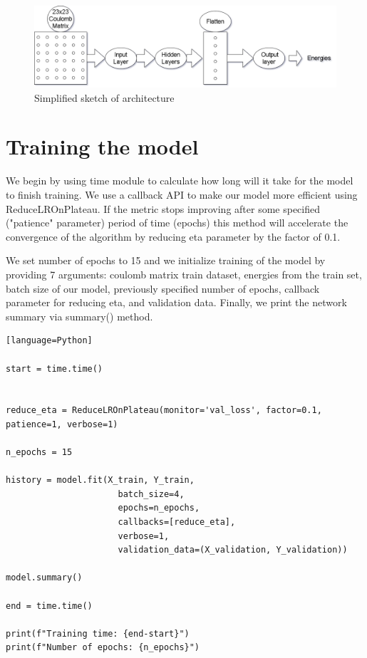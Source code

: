 \documentclass[a4paper,oneside,openright,11pt]{book}
\begin{document}
\begin{figure}[h!]
\centering
\includegraphics[scale=0.4]{DocumentFigures/MyFigures/FlattenOperatioNNscheme.png}
\caption{Simplified sketch of architecture}
\end{figure}


\section{Training the model}


We begin by using time module to calculate how long will it take for the model to finish training. We use a callback API to make our model more efficient using ReduceLROnPlateau. If the metric stops improving after some specified ("patience" parameter) period of time (epochs) this method will accelerate the convergence of the algorithm by reducing eta parameter by the factor of 0.1.

We set number of epochs to 15 and we initialize training of the model by providing 7 arguments: coulomb matrix train dataset, energies from the train set, batch size of our model, previously specified number of epochs, callback parameter for reducing eta, and validation data. Finally, we print the network summary via summary() method.

\begin{verbatim}[language=Python]

start = time.time()


reduce_eta = ReduceLROnPlateau(monitor='val_loss', factor=0.1, patience=1, verbose=1)

n_epochs = 15

history = model.fit(X_train, Y_train,
                      batch_size=4,
                      epochs=n_epochs, 
                      callbacks=[reduce_eta],
                      verbose=1,
                      validation_data=(X_validation, Y_validation))

model.summary()

end = time.time()

print(f"Training time: {end-start}")
print(f"Number of epochs: {n_epochs}")

\end{verbatim}
\end{document}
